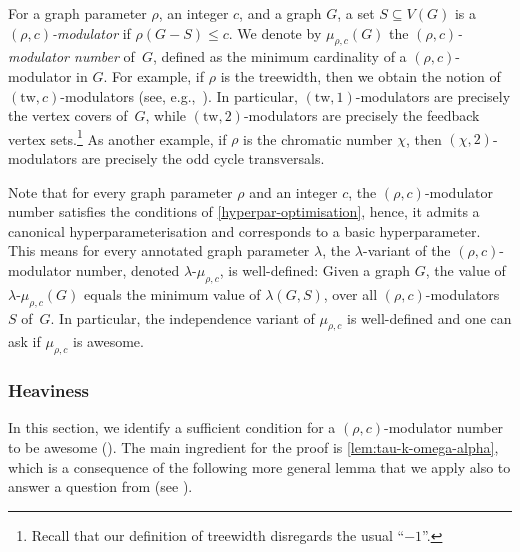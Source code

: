 \documentclass[11pt]{article}
\newcommand{\tw}{\mathrm{tw}}
\newcommand{\rhocm}{\mu_{\rho,c}}
\theoremstyle{plain}
\theoremstyle{definition}
\theoremstyle{remark}
\numberwithin{equation}{section}
\begin{document}
\begin{sloppypar}
For a graph parameter $\rho$, an integer $c$, and a graph $G$, a set $S\subseteq V(G)$ is a \emph{$(\rho,c)$-modulator} if $\rho(G-S)\le c$.
We denote by $\rhocm(G)$ the \emph{$(\rho,c)$-modulator number} of~$G$, defined as the minimum cardinality of a $(\rho,c)$-modulator in $G$.
For example, if $\rho$ is the treewidth, then we obtain the notion of $(\tw,c)$-modulators (see, e.g.,~\cite{DBLP:conf/focs/FominLMS12,DBLP:conf/icalp/LokshtanovR0SZ18,MR3149081,MR3333298}).
In particular, $(\tw,1)$-modulators are precisely the vertex covers of~$G$, while $(\tw,2)$-modulators are precisely the feedback vertex sets.\footnote{Recall that our definition of treewidth disregards the usual ``$-1$''.}
As another example, if $\rho$ is the chromatic number $\chi$, then $(\chi,2)$-modulators are precisely the odd cycle transversals.
\end{sloppypar}

Note that for every graph parameter $\rho$ and an integer $c$, the $(\rho,c)$-modulator number satisfies the conditions of \cref{hyperpar-optimisation}, hence, it admits a canonical hyperparameterisation and corresponds to a basic hyperparameter.
This means for every annotated graph parameter $\lambda$, the $\lambda$-variant of the $(\rho,c)$-modulator number, denoted $\lambda\text{-}\rhocm$, is well-defined: Given a graph $G$, the value of $\lambda\text{-}\rhocm(G)$ equals the minimum value of $\lambda(G,S)$, over all $(\rho,c)$-modulators $S$ of~$G$.
In particular, the independence variant of $\rhocm$ is well-defined and one can ask if $\rhocm$ is awesome.\\

\subsubsection{Heaviness} 

In this section, we identify a sufficient condition for a $(\rho,c)$-modulator number to be awesome ().
The main ingredient for the proof is \cref{lem:tau-k-omega-alpha}, which is a consequence of the following more general lemma that we apply also to answer a question from \cite{HMV25} (see ). 
   
\end{document}

